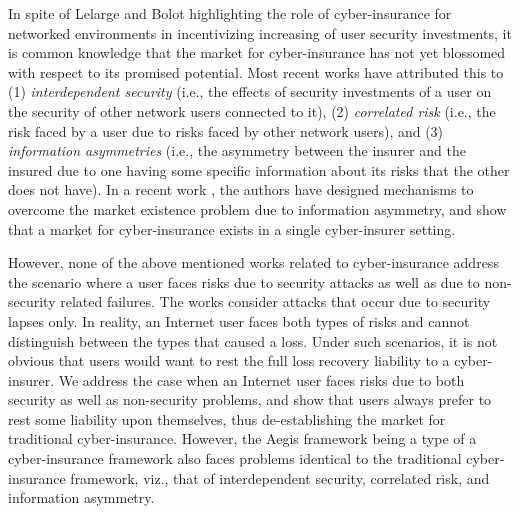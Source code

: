\documentclass[letterpaper,12pt, onecolumn, nodraft]{IEEEtran}
\begin{document}
\begin{itemize}
In spite of Lelarge and Bolot highlighting the role of cyber-insurance for
networked environments in incentivizing increasing of user security investments,
it is common knowledge that the market for cyber-insurance has not yet
blossomed with respect to its promised potential. Most recent works \cite{rabohme} \cite{ssfw} have
attributed this to
(1) \emph{interdependent security} (i.e., the effects of security investments
of a user on the security of other network users connected to it),
(2) \emph{correlated risk} (i.e., the risk faced by a user due to risks
faced by other network users),
and (3) \emph{information asymmetries} (i.e., the asymmetry between the insurer
and the insured due to one having some specific information about its risks
that the other does not have). In a recent work \cite{plg}, the authors have designed mechanisms to overcome the market existence problem due to information asymmetry, and show that a market for cyber-insurance exists in a single cyber-insurer setting.

However, none of the above mentioned works related to cyber-insurance address the scenario where a user faces risks due to security attacks as well as due to non-security related failures. The works consider attacks that occur due to security lapses only. In reality, an Internet user faces both types of risks and cannot distinguish between the types that caused a loss. Under such scenarios, it is not obvious that users would want to rest the full loss recovery liability to a cyber-insurer. We address the case when an Internet user faces risks due to both security as well as non-security problems, and show that users always prefer to rest some liability upon themselves, thus de-establishing the market for traditional cyber-insurance.
However, the Aegis framework being a type of a cyber-insurance framework also faces problems identical to the traditional cyber-insurance framework, viz., that of interdependent security, correlated risk, and information asymmetry. 


\end{itemize}
\end{document}
